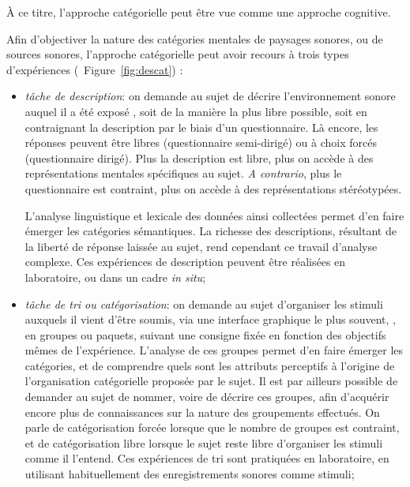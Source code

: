À ce titre, l'approche catégorielle peut être vue comme une approche cognitive. 

Afin d'objectiver la nature des catégories mentales de paysages sonores, ou de sources sonores, l'approche catégorielle peut avoir recours à trois types d'expériences (\cf~Figure~\ref{fig:descat}) :

\begin{itemize}
\item \emph{tâche de description}: on demande au sujet de décrire l'environnement sonore auquel il a été exposé \citep{axelsson2005soundscape,raimbault2005urban,guastavino2006ideal,raimbault2006qualitative}, soit de la manière la plus libre possible, soit en contraignant la description par le biais d'un questionnaire. Là encore, les réponses peuvent être libres (questionnaire semi-dirigé) ou à choix forcés (questionnaire dirigé). Plus la description est libre, plus on accède à des représentations mentales spécifiques au sujet. \emph{A contrario}, plus le questionnaire est contraint, plus on accède à des représentations stéréotypées. 

L'analyse linguistique et lexicale des données ainsi collectées permet d'en faire émerger les catégories sémantiques. La richesse des descriptions, résultant de la liberté de réponse laissée au sujet, rend cependant ce travail d'analyse complexe. Ces expériences de description peuvent être réalisées en laboratoire, ou dans un cadre \emph{in situ};

\item \emph{tâche de tri ou catégorisation}: on demande au sujet d'organiser les stimuli auxquels il vient d'être soumis, via une interface graphique le plus souvent, \citep{maffiolo_caracterisation_1999,guastavino2007categorization}, en groupes ou paquets, suivant une consigne fixée en fonction des objectifs mêmes de l'expérience. L'analyse de ces groupes permet d'en faire émerger les catégories, et de comprendre quels sont les attributs perceptifs à l'origine de l'organisation catégorielle proposée par le sujet. Il est par ailleurs possible de demander au sujet de nommer, voire de décrire ces groupes, afin d'acquérir encore plus de connaissances sur la nature des groupements effectués. On parle de catégorisation forcée lorsque que le nombre de groupes est contraint, et de catégorisation libre lorsque le sujet reste libre d'organiser les stimuli comme il l'entend. Ces expériences de tri sont pratiquées en laboratoire, en utilisant habituellement des enregistrements sonores comme stimuli;


\end{itemize}
